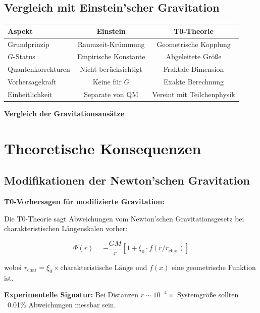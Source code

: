 	\subsection{Vergleich mit Einstein'scher Gravitation}
	
	\begin{center}
		\begin{tabular}{lcc}
			\toprule
			\textbf{Aspekt} & \textbf{Einstein} & \textbf{T0-Theorie} \\
			\midrule
			Grundprinzip & Raumzeit-Krümmung & Geometrische Kopplung \\
			$G$-Status & Empirische Konstante & Abgeleitete Größe \\
			Quantenkorrekturen & Nicht berücksichtigt & Fraktale Dimension \\
			Vorhersagekraft & Keine für $G$ & Exakte Berechnung \\
			Einheitlichkeit & Separate von QM & Vereint mit Teilchenphysik \\
			\bottomrule
		\end{tabular}
		\par\vspace{0.5em}
		\textbf{Vergleich der Gravitationsansätze}
	\end{center}
	
	\section{Theoretische Konsequenzen}
	
	\subsection{Modifikationen der Newton'schen Gravitation}
	
	\begin{warning}
		\textbf{T0-Vorhersagen für modifizierte Gravitation:}
		
		Die T0-Theorie sagt Abweichungen vom Newton'schen Gravitationsgesetz bei charakteristischen Längenskalen vorher:
		
		\begin{equation}
			\Phi(r) = -\frac{GM}{r} \left[1 + \xi_0 \cdot f(r/r_{\text{char}})\right]
		\end{equation}
		
		wobei $r_{\text{char}} = \xi_0 \times \text{charakteristische Länge}$ und $f(x)$ eine geometrische Funktion ist.
		
		\textbf{Experimentelle Signatur:} Bei Distanzen $r \sim 10^{-4} \times$ Systemgröße sollten ~0.01\% Abweichungen messbar sein.
	\end{warning}
	
